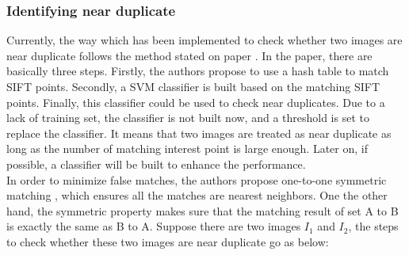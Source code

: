 \subsubsection{Identifying near duplicate}
Currently, the way which has been implemented to check whether two images are near duplicate follows the method stated on paper \cite{zhao2007near}. In the paper, there are basically three steps. Firstly, the authors propose to use a hash table to match SIFT points. Secondly, a SVM classifier is built based on the matching SIFT points. Finally, this classifier could be used to check near duplicates. Due to a lack of training set, the classifier is not built now, and a threshold is set to replace the classifier. It means that two images are treated as near duplicate as long as the number of matching interest point is large enough. Later on, if possible, a classifier will be built to enhance the performance. \\

\noindent In order to minimize false matches, the authors propose one-to-one symmetric matching \cite{zhao2007near}, which ensures all the matches are nearest neighbors. One the other hand, the symmetric property makes sure that the matching result of set A to B is exactly the same as B to A. Suppose there are two images $I_1$ and $I_2$, the steps to check whether these two images are near duplicate go as below:

